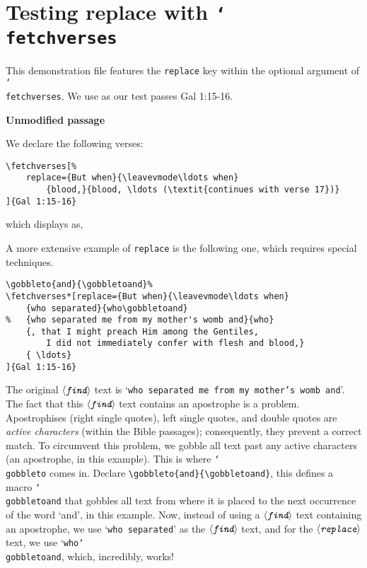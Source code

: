 \documentclass{article}
\providecommand\cs[1]{\texttt{\char`\\#1}}
\def\ameta#1{$\langle\textit{\texttt{#1}}\rangle$}
\begin{document}
\section{Testing replace with \cs{fetchverses}}

This demonstration file features the \texttt{replace} key within the
optional argument of \cs{fetchverses}. We use as our test passes \textsf{Gal
1:15-16}.

\medskip\noindent\textbf{Unmodified passage}
\begin{quote}
\eSQ{}
\end{quote}

\medskip\noindent
We declare the following verses:
\begin{Verbatim}[xleftmargin=\leftmargini,fontsize=\small]
\fetchverses[%
    replace={But when}{\leavevmode\ldots when}
        {blood,}{blood, \ldots (\textit{continues with verse 17})}
]{Gal 1:15-16}
\end{Verbatim}
which displays as,
\begin{quote}
\end{quote}

\medskip\noindent
A more extensive example of \texttt{replace} is the following one, which requires
special techniques.
\begin{Verbatim}[xleftmargin=\leftmargini,fontsize=\small]
\gobbleto{and}{\gobbletoand}%
\fetchverses*[replace={But when}{\leavevmode\ldots when}
    {who separated}{who\gobbletoand}
%   {who separated me from my mother's womb and}{who}
    {, that I might preach Him among the Gentiles,
        I did not immediately confer with flesh and blood,}
    { \ldots}
]{Gal 1:15-16}
\end{Verbatim}
\begin{quote}
%
\end{quote}
The original \ameta{find} text is `\texttt{who separated me from my mother's
womb and}'. The fact that this \ameta{find} text contains an apostrophe is a
problem. Apostrophises (right single quotes), left single quotes, and double
quotes are \emph{active characters}  (within the Bible passages);
consequently, they prevent a correct match. To circumvent this problem, we
gobble all text past any active characters (an apostrophe, in this example).
This is where \cs{gobbleto} comes in. Declare
\verb|\gobbleto{and}{\gobbletoand}|, this defines a macro \cs{gobbletoand}
that gobbles all text from where it is placed to the next occurrence of the
word `and', in this example. Now, instead of using a \ameta{find} text
containing an apostrophe, we use `\texttt{who separated}' as the \ameta{find}
text, and for the \ameta{replace} text, we use `\texttt{who\cs{gobbletoand}},
which, incredibly, works!
\end{document}
